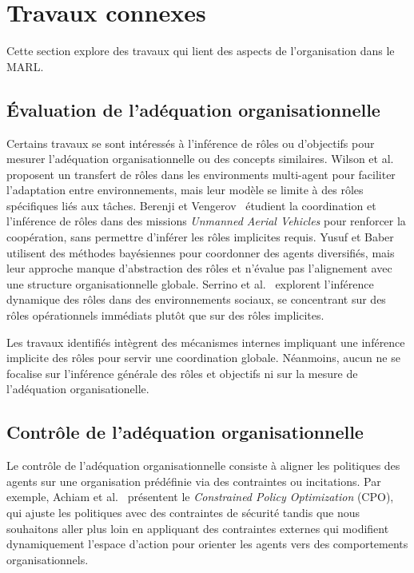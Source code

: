 \documentclass[francais,ROIA,Unicode,manuscript]{cedram}
\begin{document}
\section{Travaux connexes}
\label{sec:related_works}

Cette section explore des travaux qui lient des aspects de l'organisation dans le MARL.

\subsection{Évaluation de l'adéquation organisationnelle}

Certains travaux se sont intéressés à l'inférence de rôles ou d'objectifs pour mesurer l'adéquation organisationnelle ou des concepts similaires.
%
Wilson et al.~\cite{wilson2008learning} proposent un transfert de rôles dans les environments multi-agent pour faciliter l'adaptation entre environnements, mais leur modèle se limite à des rôles spécifiques liés aux tâches.
%
Berenji et Vengerov~\cite{berenji2000learning} étudient la coordination et l'inférence de rôles dans des missions \textit{Unmanned Aerial Vehicles} pour renforcer la coopération, sans permettre d'inférer les rôles implicites requis.
%
Yusuf et Baber~\cite{yusuf2020inferential} utilisent des méthodes bayésiennes pour coordonner des agents diversifiés, mais leur approche manque d'abstraction des rôles et n'évalue pas l'alignement avec une structure organisationnelle globale.
%
Serrino et al.~\cite{serrino2019finding} explorent l'inférence dynamique des rôles dans des environnements sociaux, se concentrant sur des rôles opérationnels immédiats plutôt que sur des rôles implicites.

Les travaux identifiés intègrent des mécanismes internes impliquant une inférence  implicite des rôles pour servir une coordination globale. Néanmoins, aucun ne se focalise sur l'inférence générale des rôles et objectifs ni sur la mesure de l'adéquation organisationelle.

\subsection{Contrôle de l'adéquation organisationnelle}

Le contrôle de l'adéquation organisationnelle consiste à aligner les politiques des agents sur une organisation prédéfinie via des contraintes ou incitations. Par exemple, Achiam et al.~\cite{achiam2017cpo} présentent le \textit{Constrained Policy Optimization} (CPO), qui ajuste les politiques avec des contraintes de sécurité tandis que nous souhaitons aller plus loin en appliquant des contraintes externes qui modifient dynamiquement l'espace d'action pour orienter les agents vers des comportements organisationnels.
\end{document}

